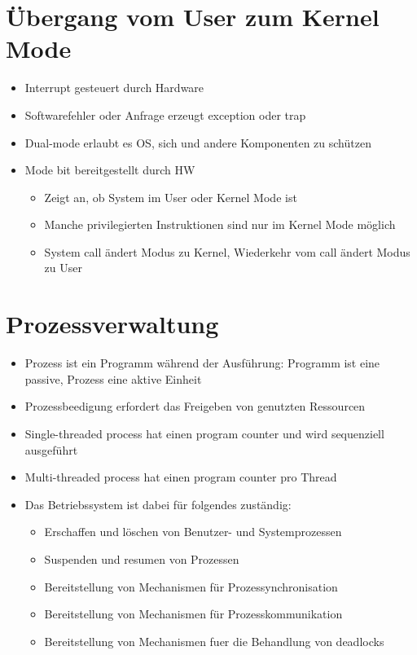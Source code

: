 \documentclass[a4paper]{scrreprt}
\begin{document}
\section{Übergang vom User zum Kernel Mode}
\begin{itemize}
	\item Interrupt gesteuert durch Hardware
	\item Softwarefehler oder Anfrage erzeugt exception oder trap
	\item Dual-mode erlaubt es OS, sich und andere Komponenten zu schützen
	\item Mode bit bereitgestellt durch HW
		\begin{itemize}
			\item Zeigt an, ob System im User oder Kernel Mode ist
			\item Manche privilegierten Instruktionen sind nur im Kernel Mode möglich
			\item System call ändert Modus zu Kernel, Wiederkehr vom call ändert Modus zu User
		\end{itemize}
\end{itemize}

\section{Prozessverwaltung}
\begin{itemize}
	\item Prozess ist ein Programm während der Ausführung: Programm ist eine passive, Prozess eine aktive Einheit
	\item Prozessbeedigung erfordert das Freigeben von genutzten Ressourcen
	\item Single-threaded process hat einen program counter und wird sequenziell ausgeführt
	\item Multi-threaded process hat einen program counter pro Thread
	\item Das Betriebssystem ist dabei für folgendes zuständig:
		\begin{itemize}
			\item Erschaffen und löschen von Benutzer- und Systemprozessen
			\item Suspenden und resumen von Prozessen
			\item Bereitstellung von Mechanismen für Prozessynchronisation
			\item Bereitstellung von Mechanismen für Prozesskommunikation
			\item Bereitstellung von Mechanismen fuer die Behandlung von deadlocks
		\end{itemize}
\end{itemize}
\end{document}
